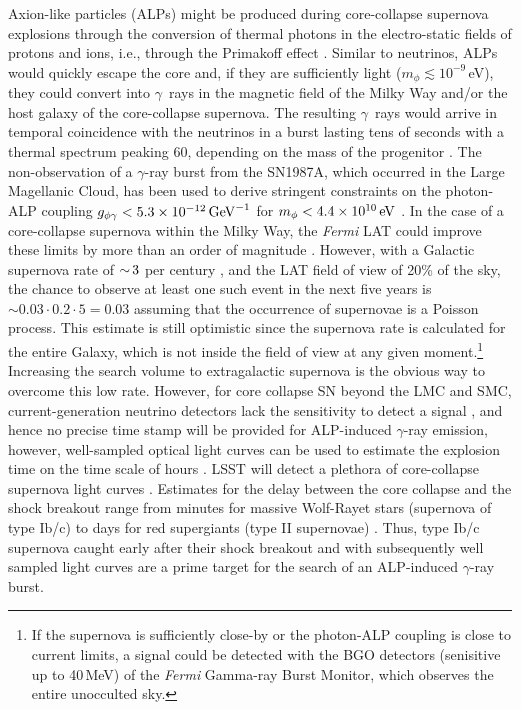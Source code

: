 Axion-like particles (ALPs) might be produced during core-collapse supernova explosions through the conversion of thermal photons in the electro-static fields of protons and ions, i.e., through the Primakoff effect \citep{1996slfp.book.....R}.  
Similar to neutrinos, ALPs would quickly escape the core and, if they are sufficiently light ($m_\phi \lesssim 10^{-9}\,$eV), they could convert into $\gamma$~rays in the magnetic field of the Milky Way and/or the host galaxy of the core-collapse supernova. 
The resulting $\gamma$~rays would arrive in temporal coincidence with the neutrinos in a burst lasting tens of seconds with a 
thermal spectrum peaking 60\MeV, depending on the mass of the progenitor \citep{2015JCAP...02..006P}.
The non-observation of a $\gamma$-ray burst from the SN1987A, which occurred in the Large Magellanic Cloud, has been used to derive stringent constraints on the photon-ALP coupling $g_{\phi\gamma}<5.3\times10^{-12}\mathrm{\,GeV}^{-1}$ for $m_\phi < 4.4\times10^{10}\mathrm{\,eV}$ \citep{1996PhLB..383..439B, 1996PhRvL..77.2372G,2015JCAP...02..006P}.
In the case of a core-collapse supernova within the Milky Way, the \textit{Fermi} LAT could improve these limits by more than an order of magnitude \citep{2017PhRvL.118a1103M}. 
However, with a Galactic supernova rate of $ {\sim}\, 3$ per century \citep[e.g.,][]{2013ApJ...778..164A}, and the LAT field of view of 20\% of the sky, the chance to observe at least one such event in the next five years is $\sim 0.03 \cdot 0.2 \cdot 5 = 0.03$ assuming that the occurrence of supernovae is a Poisson process. This estimate is still optimistic since the supernova rate is calculated for the entire Galaxy, which is not inside the field of view at any given moment.\footnote{If the supernova is sufficiently close-by or the photon-ALP coupling is close to current limits, a signal could be detected with the BGO detectors (senisitive up to 40\,MeV) of the \emph{Fermi} Gamma-ray Burst Monitor, which observes the entire unocculted sky.}
Increasing the search volume to extragalactic supernova is the obvious way to overcome this low rate. 
However, for core collapse SN beyond the LMC and SMC, current-generation neutrino detectors lack the sensitivity to detect a signal \citep[e.g.,][]{2011PhRvD..83l3008K}, and hence no precise time stamp will be provided for ALP-induced $\gamma$-ray emission, however, well-sampled optical light curves can be used to estimate the explosion time on the time scale of hours \citep{2010APh....33...19C}. 
LSST will detect a plethora of core-collapse supernova light curves \citep{Lien:2009}. 
Estimates for the delay between the core collapse and the shock breakout range from minutes for massive Wolf-Rayet stars (supernova of type Ib/c) to days for red supergiants (type II supernovae) \citep{2013ApJ...778...81K}. 
Thus, type Ib/c supernova caught early after their shock breakout and with subsequently well sampled light curves are a prime target for the search of an ALP-induced $\gamma$-ray burst. 

